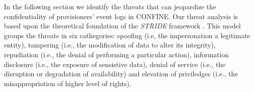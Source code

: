 \begin{newj}
	

In the following section we identify the threats that can jeopardize the confidentiality of provisioners' event logs in CONFINE. Our threat analysis is based upon the theoretical foundation of the \textit{STRIDE} framework \cite{aa}. This model groups the threats in six cathegories: spoofing (i.e, the impersonation a legitimate entity), tampering (i.e., the modification of data to alter its integrity), repudiation (i.e., the denial of performing a particular action), information disclosure (i.e., the exposure of sensistive data), denial of service (i.e., the disruption or degradation of availability) and elevation of priviledges (i.e., the misappropriation of higher level of rights).



\end{newj}


